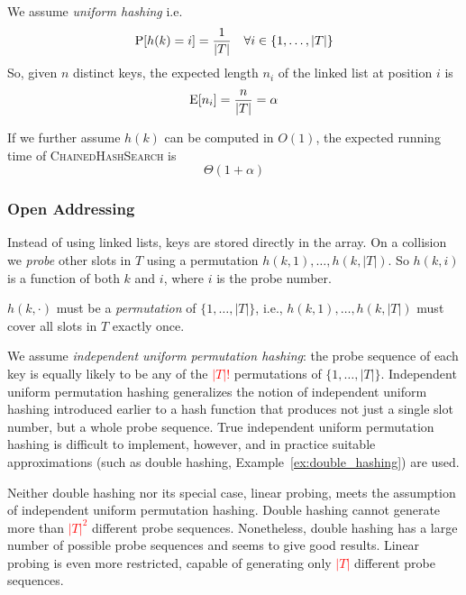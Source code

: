 We assume \emph{uniform hashing} i.e.
\[
\operatorname{P}[h(k) = i] = \frac{1}{|T|} \quad \forall i \in \{1,\dots,|T|\}
\]
So, given \(n\) distinct keys, the expected length \(n_i\) of the linked list at position \(i\) is
\[
\operatorname{E}[n_i] = \frac{n}{|T|} = \alpha
\]

If we further assume \(h(k)\) can be computed in \(O(1)\), the expected running time of \textsc{ChainedHashSearch} is
\[\boxed{
\Theta(1+\alpha)
}\]

\subsubsection{Open Addressing}

Instead of using linked lists, keys are stored directly in the array. 
On a collision we \emph{probe} other slots in \(T\) using a permutation \(h(k,1),\dots,h(k,|T|)\). 
So \(h(k,i)\) is a function of both \(k\) and \(i\), where \(i\) is the probe number.

\(h(k,\cdot)\) must be a \emph{permutation} of \(\{1,\dots,|T|\}\), i.e., \(h(k,1), \dots, h(k,|T|)\) must cover all slots in \(T\) exactly once.


We assume \emph{independent uniform permutation hashing}: the probe sequence of each key is equally likely to be any of the \textcolor{red}{\(|T|!\)} permutations of \(\{1,\dots,|T|\}\).
Independent uniform permutation hashing generalizes the notion of independent uniform hashing introduced earlier to a hash function that produces not just a single slot number, but a whole probe sequence. 
True independent uniform permutation hashing is difficult to implement, however, and in practice suitable approximations (such as double hashing,  Example~\ref{ex:double_hashing}) are used.

Neither double hashing nor its special case, linear probing, meets the assumption of independent uniform permutation hashing. 
Double hashing cannot generate more than \textcolor{red}{\(|T|^2\)} different probe sequences.
Nonetheless, double hashing has a large number of possible probe sequences and seems to give good results. 
Linear probing is even more restricted, capable of generating only \textcolor{red}{\(|T|\)} different probe sequences.

